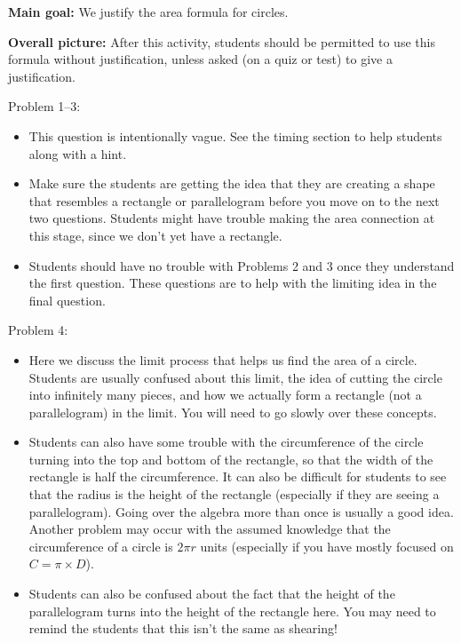 \documentclass[nooutcomes,noauthor]{ximera}
\begin{document}
\begin{instructorNotes}
{\bf Main goal:} We justify the area formula for circles.  


{\bf Overall picture:} After this activity, students should be permitted to use this formula without justification, unless asked (on a quiz or test) to give a justification.  

Problem 1--3: 
\begin{itemize}
\item This question is intentionally vague.  See the timing section to help students along with a hint.

\item Make sure the students are getting the idea that they are creating a shape that resembles a rectangle or parallelogram before you move on to the next two questions.  Students might have trouble making the area connection at this stage, since we don't yet have a rectangle.

\item Students should have no trouble with Problems 2 and 3 once they understand the first question.  These questions are to help with the limiting idea in the final question.

\end{itemize}

Problem 4:
\begin{itemize}
\item Here we discuss the limit process that helps us find the area of a circle.  Students are usually confused about this limit, the idea of cutting the circle into infinitely many pieces, and how we actually form a rectangle (not a parallelogram) in the limit.  You will need to go slowly over these concepts.


\item Students can also have some trouble with the circumference of the circle turning into the top and bottom of the rectangle, so that the width of the rectangle is half the circumference.  It can also be difficult for students to see that the radius is the height of the rectangle (especially if they are seeing a parallelogram).  Going over the algebra more than once is usually a good idea.  Another problem may occur with the assumed knowledge that the circumference of a circle is $2\pi r$  units (especially if you have mostly focused on $C = \pi \times D$).  

\item Students can also be confused about the fact that the height of the parallelogram turns into the height of the rectangle here. You may need to remind the students that this isn't the same as shearing!


\end{itemize}
\end{instructorNotes}
\end{document}
